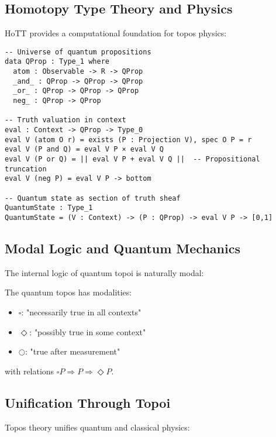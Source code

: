 \subsection{Homotopy Type Theory and Physics}

HoTT provides a computational foundation for topos physics:

\begin{example}
\begin{verbatim}
-- Universe of quantum propositions
data QProp : Type_1 where
  atom : Observable -> R -> QProp
  _and_ : QProp -> QProp -> QProp
  _or_ : QProp -> QProp -> QProp
  neg_ : QProp -> QProp

-- Truth valuation in context
eval : Context -> QProp -> Type_0
eval V (atom O r) = exists (P : Projection V), spec O P = r
eval V (P and Q) = eval V P × eval V Q
eval V (P or Q) = || eval V P + eval V Q ||  -- Propositional truncation
eval V (neg P) = eval V P -> bottom

-- Quantum state as section of truth sheaf
QuantumState : Type_1
QuantumState = (V : Context) -> (P : QProp) -> eval V P -> [0,1]
\end{verbatim}
\end{example}

\subsection{Modal Logic and Quantum Mechanics}

The internal logic of quantum topoi is naturally modal:

\begin{definition}
The quantum topos has modalities:
\begin{itemize}
\item $\square$: "necessarily true in all contexts"
\item $\Diamond$: "possibly true in some context"
\item $\bigcirc$: "true after measurement"
\end{itemize}
with relations $\square P \Rightarrow P \Rightarrow \Diamond P$.
\end{definition}

\subsection{Unification Through Topoi}

Topos theory unifies quantum and classical physics:

